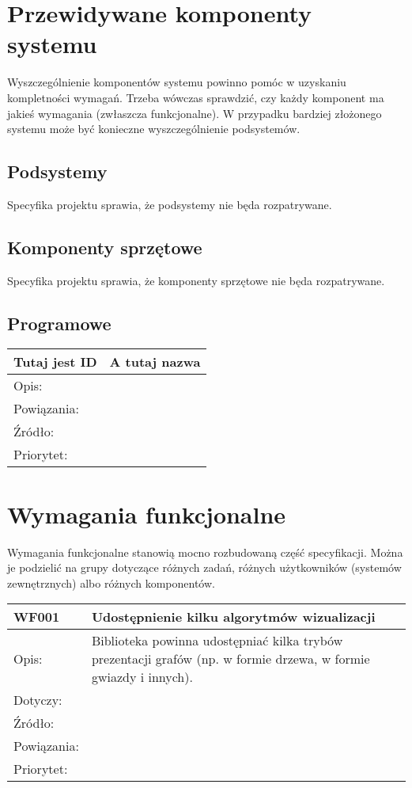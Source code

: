 \documentclass[a4paper,10pt]{article}
\begin{document}
\section{Przewidywane komponenty systemu}

Wyszczególnienie komponentów systemu powinno pomóc w uzyskaniu kompletności wymagań. Trzeba wówczas sprawdzić, czy każdy komponent ma jakieś wymagania (zwłaszcza funkcjonalne). W przypadku bardziej złożonego systemu może być konieczne wyszczególnienie podsystemów.

\subsection{Podsystemy}
Specyfika projektu sprawia, że podsystemy nie będa rozpatrywane.

\subsection{Komponenty sprzętowe}
Specyfika projektu sprawia, że komponenty sprzętowe nie będa rozpatrywane. 

\subsection{Programowe}

\begin{center}
\begin{tabular}{|p{3cm}|p{9cm}|} \hline

Tutaj jest ID & A tutaj nazwa \\ \hline
Opis: &  \\ \hline
Powiązania: &  \\ \hline
Źródło: &  \\ \hline
Priorytet: &  \\ \hline

\end{tabular}
\end{center}

\section{Wymagania funkcjonalne}

Wymagania funkcjonalne stanowią mocno rozbudowaną część specyfikacji. Można je podzielić na grupy dotyczące różnych zadań, różnych użytkowników (systemów zewnętrznych) albo różnych komponentów.


\begin{tabular}{|p{3cm}|p{9cm}|} \hline

WF001 & Udostępnienie kilku algorytmów wizualizacji \\ \hline
Opis: & Biblioteka powinna udostępniać kilka trybów prezentacji grafów (np. w formie drzewa, w formie gwiazdy i innych).    \\ \hline
Dotyczy: &  \\ \hline
Źródło: &  \\ \hline
Powiązania: & \\ \hline
Priorytet: &  \\ \hline

\end{tabular}
\end{document}
